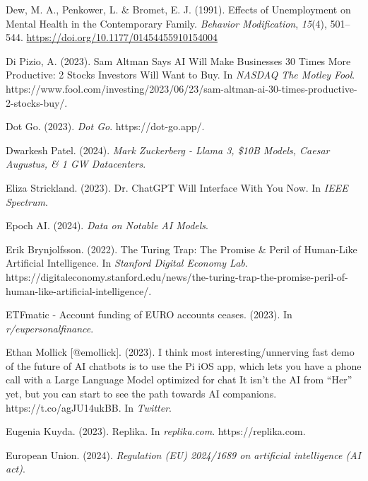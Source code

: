 \documentclass[
  letterpaper,
  DIV=11,
  numbers=noendperiod]{scrartcl}
\newlength{\cslhangindent}
\newenvironment{CSLReferences}[2] %
 {\begin{list}{}{%
  \setlength{\itemindent}{0pt}
  \setlength{\leftmargin}{0pt}
  \setlength{\parsep}{0pt}
  \ifodd #1
   \setlength{\leftmargin}{\cslhangindent}
   \setlength{\itemindent}{-1\cslhangindent}
  \fi
  \setlength{\itemsep}{#2\baselineskip}}}
 {\end{list}}
\begin{document}
\begin{CSLReferences}{1}{0}
Dew, M. A., Penkower, L. \& Bromet, E. J. (1991). Effects of
{Unemployment} on {Mental Health} in the {Contemporary Family}.
\emph{Behavior Modification}, \emph{15}(4), 501--544.
\url{https://doi.org/10.1177/01454455910154004}

Di Pizio, A. (2023). Sam {Altman Says AI Will Make Businesses} 30 {Times
More Productive}: 2 {Stocks Investors Will Want} to {Buy}. In
\emph{NASDAQ The Motley Fool}.
https://www.fool.com/investing/2023/06/23/sam-altman-ai-30-times-productive-2-stocks-buy/.

Dot Go. (2023). \emph{Dot {Go}}. https://dot-go.app/.

Dwarkesh Patel. (2024). \emph{Mark {Zuckerberg} - {Llama} 3, \${10B
Models}, {Caesar Augustus}, \& 1 {GW Datacenters}}.

Eliza Strickland. (2023). Dr. {ChatGPT Will Interface With You Now}. In
\emph{IEEE Spectrum}.

Epoch AI. (2024). \emph{Data on {Notable AI Models}}.

Erik Brynjolfsson. (2022). The {Turing Trap}: {The Promise} \& {Peril}
of {Human-Like Artificial Intelligence}. In \emph{Stanford Digital
Economy Lab}.
https://digitaleconomy.stanford.edu/news/the-turing-trap-the-promise-peril-of-human-like-artificial-intelligence/.

{ETFmatic} - {Account} funding of {EURO} accounts ceases. (2023). In
\emph{r/eupersonalfinance}.

Ethan Mollick {[}@emollick{]}. (2023). I think most
interesting/unnerving fast demo of the future of {AI} chatbots is to use
the {Pi iOS} app, which lets you have a phone call with a {Large
Language Model} optimized for chat {It} isn't the {AI} from {``{Her}''}
yet, but you can start to see the path towards {AI} companions.
{https://t.co/agJU14ukBB}. In \emph{Twitter}.

Eugenia Kuyda. (2023). Replika. In \emph{replika.com}.
https://replika.com.

European Union. (2024). \emph{Regulation ({EU}) 2024/1689 on artificial
intelligence ({AI} act)}.


\end{CSLReferences}
\end{document}
